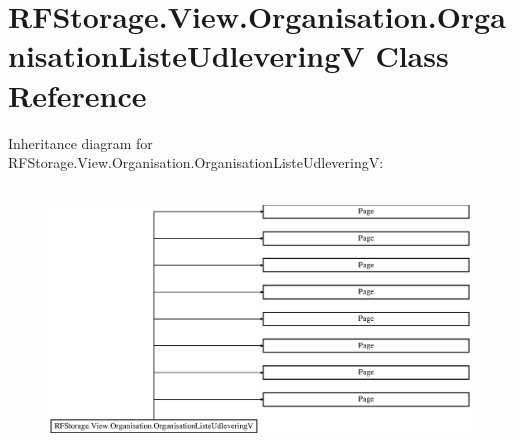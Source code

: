 \hypertarget{class_r_f_storage_1_1_view_1_1_organisation_1_1_organisation_liste_udlevering_v}{}\section{R\+F\+Storage.\+View.\+Organisation.\+Organisation\+Liste\+UdleveringV Class Reference}
\label{class_r_f_storage_1_1_view_1_1_organisation_1_1_organisation_liste_udlevering_v}
Inheritance diagram for R\+F\+Storage.\+View.\+Organisation.\+Organisation\+Liste\+UdleveringV\+:\begin{figure}[H]
\begin{center}
\leavevmode
\includegraphics[height=7.000000cm]{class_r_f_storage_1_1_view_1_1_organisation_1_1_organisation_liste_udlevering_v}
\end{center}
\end{figure}
